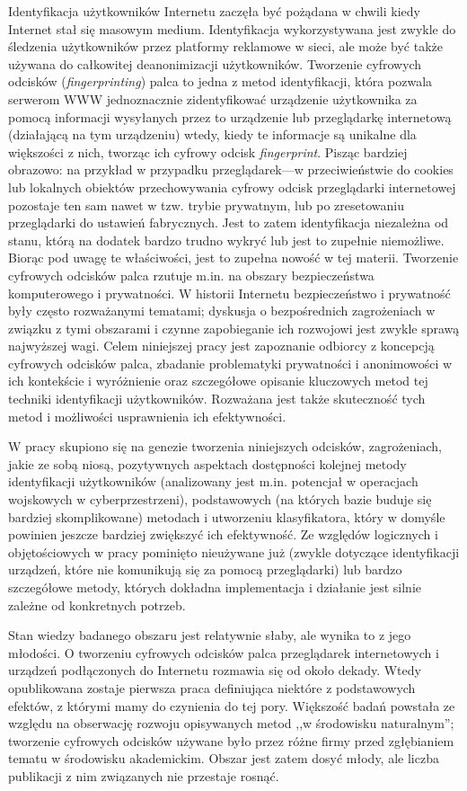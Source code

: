 Identyfikacja użytkowników Internetu zaczęła być pożądana w chwili kiedy
Internet stał się masowym medium. Identyfikacja wykorzystywana jest zwykle do
śledzenia użytkowników przez platformy reklamowe w sieci, ale może być także
używana do całkowitej deanonimizacji użytkowników. Tworzenie cyfrowych odcisków
(\emph{fingerprinting}) palca to jedna z metod identyfikacji, która pozwala
serwerom WWW jednoznacznie zidentyfikować urządzenie użytkownika za pomocą
informacji wysyłanych przez to urządzenie lub przeglądarkę internetową
(działającą na tym urządzeniu) wtedy, kiedy te informacje są unikalne dla
większości z nich, tworząc ich cyfrowy odcisk \emph{fingerprint}. Pisząc
bardziej obrazowo: na przykład w przypadku przeglądarek---w przeciwieństwie do
cookies lub lokalnych obiektów przechowywania cyfrowy odcisk przeglądarki
internetowej pozostaje ten sam nawet w tzw. trybie prywatnym, lub po
zresetowaniu przeglądarki do ustawień fabrycznych. Jest to zatem identyfikacja
niezależna od stanu, którą na dodatek bardzo trudno wykryć lub jest to zupełnie
niemożliwe. Biorąc pod uwagę te właściwości, jest to zupełna nowość w tej
materii. Tworzenie cyfrowych odcisków palca rzutuje m.in. na obszary
bezpieczeństwa komputerowego i prywatności. W historii Internetu bezpieczeństwo
i prywatność były często rozważanymi tematami; dyskusja o bezpośrednich
zagrożeniach w związku z tymi obszarami i czynne zapobieganie ich rozwojowi jest
zwykle sprawą najwyższej wagi. Celem niniejszej pracy jest zapoznanie odbiorcy z
koncepcją cyfrowych odcisków palca, zbadanie problematyki prywatności i
anonimowości w ich kontekście i wyróżnienie oraz szczegółowe opisanie kluczowych
metod tej techniki identyfikacji użytkowników. Rozważana jest także skuteczność
tych metod i możliwości usprawnienia ich efektywności.

W pracy skupiono się na genezie tworzenia niniejszych odcisków, zagrożeniach,
jakie ze sobą niosą, pozytywnych aspektach dostępności kolejnej metody
identyfikacji użytkowników (analizowany jest m.in. potencjał w operacjach
wojskowych w cyberprzestrzeni), podstawowych (na których bazie buduje się
bardziej skomplikowane) metodach i utworzeniu klasyfikatora, który w domyśle
powinien jeszcze bardziej zwiększyć ich efektywność. Ze względów logicznych i
objętościowych w pracy pominięto nieużywane już (zwykle dotyczące identyfikacji
urządzeń, które nie komunikują się za pomocą przeglądarki) lub bardzo
szczegółowe metody, których dokładna implementacja i działanie jest silnie
zależne od konkretnych potrzeb.

Stan wiedzy badanego obszaru jest relatywnie słaby, ale wynika to z jego
młodości. O tworzeniu cyfrowych odcisków palca przeglądarek internetowych i
urządzeń podłączonych do Internetu rozmawia się od około dekady. Wtedy
opublikowana zostaje pierwsza praca definiująca niektóre z podstawowych efektów,
z którymi mamy do czynienia do tej pory. Większość badań powstała ze względu na
obserwację rozwoju opisywanych metod ,,w środowisku naturalnym''; tworzenie
cyfrowych odcisków używane było przez różne firmy przed zgłębianiem tematu w
środowisku akademickim. Obszar jest zatem dosyć młody, ale liczba publikacji z
nim związanych nie przestaje rosnąć.
